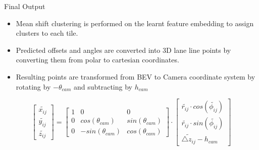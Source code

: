 \documentclass[aspectratio=169]{beamer}
\begin{document}
\begin{frame}{Final Output}
    \begin{itemize}
        \item Mean shift clustering is performed on the learnt feature embedding to assign clusters to each tile.
        \item Predicted offsets and angles are converted into 3D lane line points by converting them from polar to cartesian coordinates.
        \item Resulting points are transformed from BEV to Camera coordinate system by rotating by  $-\theta_{cam}$ and subtracting by $h_{cam}$
    \end{itemize}

    \begin{equation}
            \begin{bmatrix}\widetilde{x_{ij}}  \\\widetilde{y_{ij}} \\ \widetilde{z_{ij}}  \end{bmatrix} = \begin{bmatrix}1 & 0 & 0  \\ 0  & cos(\theta_{cam}) & sin(\theta_{cam}) \\ 0  & -sin(\theta_{cam}) & cos(\theta_{cam}) \end{bmatrix} \cdot \begin{bmatrix}\widetilde{r_{ij}} \cdot cos(\widetilde{\phi_{ij}})  \\\widetilde{r_{ij}} \cdot sin(\widetilde{\phi_{ij}})  \\ \widetilde{\triangle z_{ij}} - h_{cam} \end{bmatrix}
        \end{equation}
\end{frame}
\end{document}
